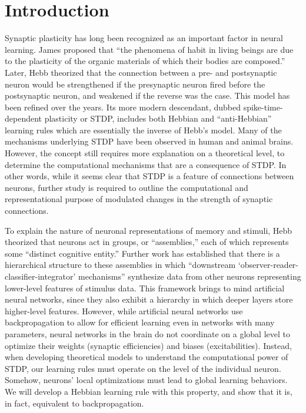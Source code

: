 \documentclass[12pt]{article}
\begin{document}
\section{Introduction}
Synaptic plasticity has long been recognized as an important factor in neural learning. James \cite{James1890} proposed that ``the phenomena of habit in living beings are due to the plasticity of the organic materials of which their bodies are composed.'' Later, Hebb \cite{Hebb1949} theorized that the connection between a pre- and postsynaptic neuron would be strengthened if the presynaptic neuron fired before the postsynaptic neuron, and weakened if the reverse was the case. This model has been refined over the years. \cite{Markram2012} Its more modern descendant, dubbed spike-time-dependent plasticity or STDP, includes both Hebbian and ``anti-Hebbian'' learning rules which are essentially the inverse of Hebb's model. \cite{Carlson1990} Many of the mechanisms underlying STDP have been observed in human and animal brains. \cite{Markram2011} However, the concept still requires more explanation on a theoretical level, to determine the computational mechanisms that are a consequence of STDP. In other words, while it seems clear that STDP is a feature of connections between neurons, further study is required to outline the computational and representational purpose of modulated changes in the strength of synaptic connections.

To explain the nature of neuronal representations of memory and stimuli, Hebb theorized that neurons act in groups, or ``assemblies,'' each of which represents some ``distinct cognitive entity.'' \cite{Hebb1949} Further work has established that there is a hierarchical structure to these assemblies in which ``downstream `observer-reader-classifier-integrator' mechanisms'' synthesize data from other neurons representing lower-level features of stimulus data. \cite{Buzsaki2010} This framework brings to mind artificial neural networks, since they also exhibit a hierarchy in which deeper layers store higher-level features. \cite{HighLevelFeaturesANN} However, while artificial neural networks use backpropagation to allow for efficient learning even in networks with many parameters, \cite{backprop} neural networks in the brain do not coordinate on a global level to optimize their weights (synaptic efficiencies) and biases (excitabilities). \cite{Dahmen2022} Instead, when developing theoretical models to understand the computational power of STDP, our learning rules must operate on the level of the individual neuron. Somehow, neurons' local optimizations must lead to global learning behaviors. We will develop a Hebbian learning rule with this property, and show that it is, in fact, equivalent to backpropagation.
\end{document}
